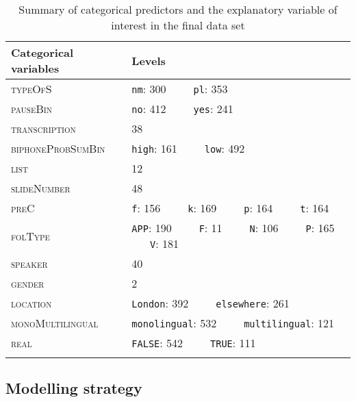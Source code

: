 \begin{table}\fontsize{10}{11}
\caption{Summary of categorical predictors and the explanatory variable of interest in the final data set}
\label{tab:5.3}
\centering
\begin{tabular}{ll}
\lsptoprule
Categorical variables & Levels                                                   \\
\midrule
\textsc{typeOfS}               & \texttt{nm}: 300~ ~ ~ \texttt{pl}: 353                                     \\
\textsc{pauseBin}              & \texttt{no}: 412~ ~ ~ \texttt{yes}: 241                                    \\
\textsc{transcription}         & 38                                                       \\
\textsc{biphoneProbSumBin}     & \texttt{high}: 161~ ~ ~ \texttt{low}: 492                                  \\
\textsc{list}                  & 12                                                       \\
\textsc{slideNumber}           & 48                                                       \\
\textsc{preC}                  & \texttt{f}: 156~ ~ ~ \texttt{k}: 169~ ~ ~ \texttt{p}: 164~ ~ ~ \texttt{t}: 164               \\
\textsc{folType}               & \texttt{APP}: 190~ ~ ~ \texttt{F}: 11~ ~ ~ \texttt{N}: 106~ ~ ~ \texttt{P}: 165~ ~ ~ \texttt{V}: 181  \\
\textsc{speaker}               & 40                                                       \\
\textsc{gender}                & 2                                                        \\
\textsc{location}              & \texttt{London}: 392~ ~ ~ \texttt{elsewhere}: 261                          \\
\textsc{monoMultilingual}      & \texttt{monolingual}: 532~ ~ ~ \texttt{multilingual}: 121                  \\
\textsc{real}                  & \texttt{FALSE}: 542~ ~ ~ \texttt{TRUE}: 111                               \\
\lspbottomrule
\end{tabular}
\end{table}

\subsection{Modelling strategy}\label{section05_2_3}

